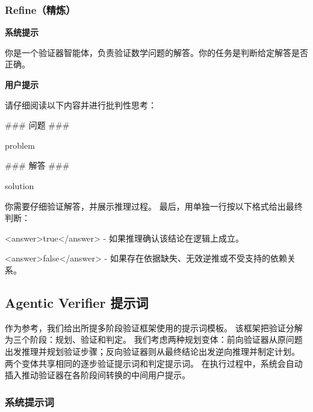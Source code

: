 \documentclass[11pt]{article}
\begin{document}
\subsubsection{Refine（精炼）}
\label{sec:appendix_refine_prompt}

\vspace{2pt}
\noindent\textbf{系统提示}
\begin{promptbox}
你是一个验证器智能体，负责验证数学问题的解答。你的任务是判断给定解答是否正确。
\end{promptbox}

\vspace{2pt}
\noindent\textbf{用户提示}
\begin{promptbox}
请仔细阅读以下内容并进行批判性思考：

### 问题 ###

{problem}

### 解答 ###

{solution}

你需要仔细验证解答，并展示推理过程。
最后，用单独一行按以下格式给出最终判断：

<answer>true</answer>  - 如果推理确认该结论在逻辑上成立。

<answer>false</answer> - 如果存在依据缺失、无效逆推或不受支持的依赖关系。
\end{promptbox}

\subsection{Agentic Verifier 提示词}
\label{sec:appendix_ours_prompts}

作为参考，我们给出所提多阶段验证框架使用的提示词模板。
该框架把验证分解为三个阶段：规划、验证和判定。
我们考虑两种规划变体：前向验证器从原问题出发推理并规划验证步骤；反向验证器则从最终结论出发逆向推理并制定计划。
两个变体共享相同的逐步验证提示词和判定提示词。
在执行过程中，系统会自动插入推动验证器在各阶段间转换的中间用户提示。

\subsubsection{系统提示词}
\end{document}
